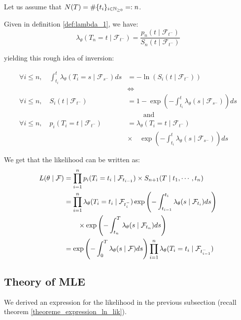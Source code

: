 \begin{demo}{}{}
Let us assume that $N(T) = \# \{  t_i  \}_{ i \in \mathbb{N}_{\geq 0}} =: n$.

Given in definition \ref{def:lambda_1}, we have:
$$\lambda_{\theta}( T_n = t \mid \mathcal F_{t^-} ) = \frac{ p_n( t \mid \mathcal F_{t^-} )}{S_n( t \mid \mathcal F_{t^-} )}$$


yielding  this rough idea of inversion:

\begin{align*}
\forall i \leq n, \quad \int_{t_i}^t \lambda_{\theta}( T_i = s \mid \mathcal F_{s^-} ) ds &= - \ln ( S_i (t \mid \mathcal F_{t^-} ))  \\
& \iff \\
\forall i \leq n, \quad  S_i( t \mid \mathcal F_{t^-} ) & = 1 -  \exp \left ( - \int_{t_i}^t \lambda_{\theta} ( s \mid \mathcal F_{s^-} ) \right ) ds \\
& \qquad \text{ and } \\
\forall i \leq n, \quad  p_i( T_i = t \mid \mathcal F_{t^-} ) & = \lambda_{\theta} ( T_i = t \mid \mathcal F_{t^-} ) \\
& \times \quad \exp \left ( - \int_{t_i}^t \lambda_{\theta} ( s \mid \mathcal F_{s^-} ) \right ) ds 
\end{align*} 


We get that the likelihood can be written as:
\begin{align}
L( \theta \mid \mathcal F ) &= \prod_{i=1}^n p_i( T_i = t_i \mid \mathcal F_{t_{i-1}} ) \times S_{n+1} ( T \mid t_1, \cdots, t_n ) \notag \\
&=  \prod_{i=1}^n  \lambda_{\theta} ( T_i = t_i \mid \mathcal F_{t_i^-} ) \exp \left ( - \int_{t_{i-1}}^{t_{i}} \lambda_{\theta} ( s \mid \mathcal F_{t_i} ) ds \right ) \notag \\
 & \qquad \times \exp \left ( - \int_{t_n}^T \lambda_{\theta} ( s \mid \mathcal F_{t_n} ) ds \right ) \notag \\
&=  \exp \left ( - \int_{0}^{T} \lambda_{\theta} ( s \mid \mathcal F ) ds \right )  \prod_{i=1}^n  \lambda_{\theta} ( T_i = t_i \mid \mathcal F_{t_{i-1}^-} )   
\end{align}
\end{demo}{}{}













\subsection{Theory of MLE}
We derived an expression for the likelihood in the previous subsection (recall theorem \ref{theoreme_expression_ln_lik}). 

